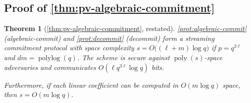 \documentclass[10pt,a4paper]{article}
\newtheorem{theorem}{Theorem}[section]
\theoremstyle{definition}
\newcommand{\poly}{\operatorname{poly}}
\newcommand{\polylog}{\operatorname{polylog}}
\newcommand{\pcommitlength}{p}
\newcommand{\dimension}{m}
\newcommand{\degree}{d}
\newcommand{\fieldsize}{q}
\begin{document}
\subsection{Proof of \texorpdfstring{\cref{thm:pv-algebraic-commitment}}{Theorem \ref{thm:pv-algebraic-commitment}}}
\label{sec:deferred-pv-algebraic-commit}

\begin{theorem}[\cref{thm:pv-algebraic-commitment}, restated]
    \cref{prot:algebraic-commit} (\textsf{algebraic-commit}) and \cref{prot:decommit} (\textsf{decommit}) form a streaming commitment protocol with space complexity $s = O\big((\ell + \dimension) \log \fieldsize\big)$ if $\pcommitlength = \fieldsize^{3\ell}$ and $\degree \dimension = \polylog(\fieldsize)$. The scheme is secure against $\poly(s)$-space adversaries and communicates $O(\ell \fieldsize^{3 \ell} \log \fieldsize)$ bits.
    
    Furthermore, if each linear coefficient can be computed in $O(\dimension \log \fieldsize)$ space, then $s = O(\dimension \log \fieldsize)$.
\end{theorem}
\end{document}
